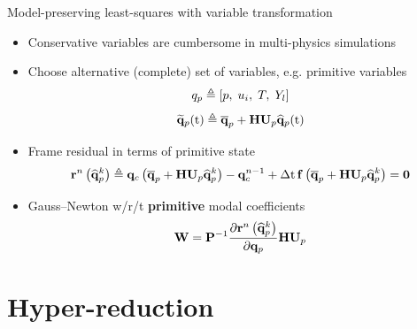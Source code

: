 \documentclass[]{beamer}
\begin{document}
\begin{frame}{Model-preserving least-squares with variable transformation}
    \begin{itemize}
		\item Conservative variables are cumbersome in multi-physics simulations
		\item Choose alternative (complete) set of variables, e.g. primitive variables
		\begin{equation*}
			q_p \triangleq \left[ p, \; u_i, \; T, \; Y_l \right]
		\end{equation*}
		\begin{equation*}
			\primVecRom(\timeVar) \triangleq \primVecCent + \primScale \primTrial \primVecCoef(\timeVar)
		\end{equation*}
		\item Frame residual in terms of primitive state
		\begin{equation*}
			\resFuncIter{\timeIdx}{\primVecCoef^{\newtonIdx}} \triangleq \consFunc{\primVecCent + \primScale \primTrial \primVecCoef^{\newtonIdx}} - \consVec^{\timeIdx-1} + \dt \, \rhsFunc{\primVecCent + \primScale \primTrial \primVecCoef^{\newtonIdx}} = \zeroVec
		\end{equation*}
		\item Gauss--Newton w/r/t \textbf{primitive} modal coefficients
		\begin{equation*}
			\testBasis = \consScaleInv \pde{\resFuncIter{\timeIdx}{\primVecCoef^{\newtonIdx}}}{\primVec} \primScale \primTrial
		\end{equation*}
	\end{itemize}
\end{frame}

\section*{Hyper-reduction}
\end{document}
